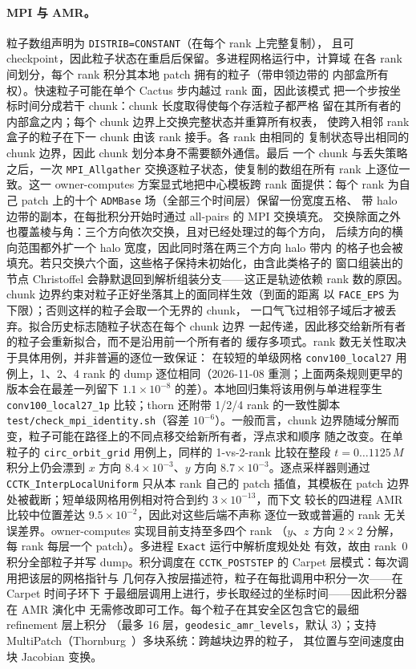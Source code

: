 \documentclass[11pt,UTF8]{ctexart}
\begin{document}
\paragraph{MPI 与 AMR。}
粒子数组声明为 \texttt{DISTRIB=CONSTANT}（在每个 rank 上完整复制），
且可 checkpoint，因此粒子状态在重启后保留。多进程网格运行中，计算域
在各 rank 间划分，每个 rank 积分其本地 patch 拥有的粒子（带申领边带的
内部盒所有权）。快速粒子可能在单个 Cactus 步内越过 rank 面，因此该模式
把一个步按坐标时间分成若干 chunk：chunk 长度取得使每个存活粒子都严格
留在其所有者的内部盒之内；每个 chunk 边界上交换完整状态并重算所有权表，
使跨入相邻 rank 盒子的粒子在下一 chunk 由该 rank 接手。各 rank 由相同的
复制状态导出相同的 chunk 边界，因此 chunk 划分本身不需要额外通信。最后
一个 chunk 与丢失策略之后，一次 \texttt{MPI\_Allgather}
交换逐粒子状态，使复制的数组在所有 rank 上逐位一致。这一
owner-computes 方案显式地把中心模板跨 rank 面提供：每个 rank 为自己
patch 上的十个 \texttt{ADMBase} 场（全部三个时间层）保留一份宽度五格、
带 halo 边带的副本，在每批积分开始时通过 all-pairs 的 MPI 交换填充。
交换除面之外也覆盖棱与角：三个方向依次交换，且对已经处理过的每个方向，
后续方向的横向范围都外扩一个 halo 宽度，因此同时落在两三个方向 halo 带内
的格子也会被填充。若只交换六个面，这些格子保持未初始化，由含此类格子的
窗口组装出的节点 Christoffel 会静默退回到解析组装分支——这正是轨迹依赖
rank 数的原因。chunk 边界约束对粒子正好坐落其上的面同样生效（到面的距离
以 \texttt{FACE\_EPS} 为下限）；否则这样的粒子会取一个无界的 chunk，
一口气飞过相邻子域后才被丢弃。拟合历史标志随粒子状态在每个 chunk 边界
一起传递，因此移交给新所有者的粒子会重新拟合，而不是沿用前一个所有者的
缓存多项式。rank 数无关性取决于具体用例，并非普遍的逐位一致保证：
在较短的单级网格 \texttt{conv100\_local27} 用例上，1、2、4 rank 的 dump
逐位相同（2026-11-08 重测；上面两条规则更早的版本会在最差一列留下
$1.1\times10^{-8}$ 的差）。本地回归集将该用例与单进程孪生
\texttt{conv100\_local27\_1p} 比较；thorn 还附带 1/2/4 rank 的一致性脚本
\texttt{test/check\_mpi\_identity.sh}（容差 $10^{-6}$）。一般而言，chunk
边界随域分解而变，粒子可能在路径上的不同点移交给新所有者，浮点求和顺序
随之改变。在单粒子的 \texttt{circ\_orbit\_grid} 用例上，同样的
1-vs-2-rank 比较在整段 $t = 0 \ldots 1125\,M$ 积分上仍会漂到 $x$ 方向
$8.4\times10^{-3}$、$y$ 方向 $8.7\times10^{-3}$。逐点采样器则通过
\texttt{CCTK\_InterpLocalUniform} 只从本 rank 自己的 patch 插值，其模板在
patch 边界处被截断；短单级网格用例相对符合到约 $3\times10^{-13}$，而下文
较长的四进程 AMR 比较中位置差达 $9.5\times10^{-2}$，因此对这些后端不声称
逐位一致或普遍的 rank 无关误差界。owner-computes 实现目前支持至多四个 rank
（$y$、$z$ 方向 $2\times2$ 分解，
每 rank 每层一个 patch）。多进程 \texttt{Exact} 运行中解析度规处处
有效，故由 rank~0 积分全部粒子并写 dump。积分调度在
\texttt{CCTK\_POSTSTEP} 的 Carpet 层模式：每次调用把该层的网格指针与
几何存入按层描述符，粒子在每批调用中积分一次——在 Carpet 时间子环下
于最细层调用上进行，步长取经过的坐标时间——因此积分器在 AMR 演化中
无需修改即可工作。每个粒子在其安全区包含它的最细 refinement 层上积分
（最多 16 层，\texttt{geodesic\_amr\_levels}，默认 3）；支持
MultiPatch（Thornburg~\citep{thornburg2004}）多块系统：跨越块边界的粒子，
其位置与空间速度由块 Jacobian 变换。
\end{document}

